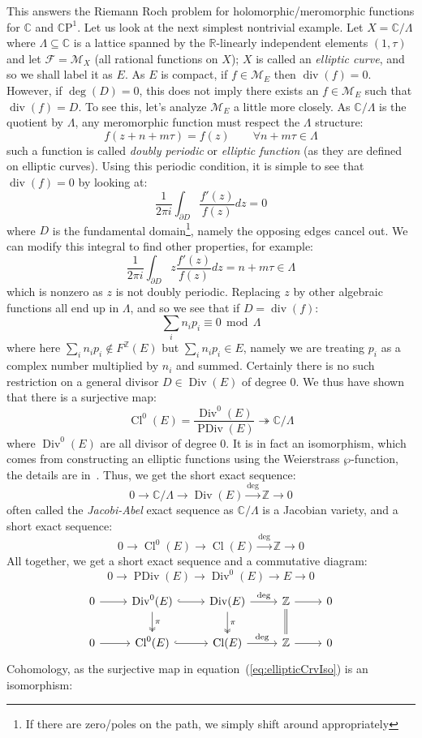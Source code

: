 \documentclass{book}
\newcommand{\C}{{\mathbb{C}}}
\newcommand{\R}{{\mathbb{R}}}
\newcommand{\Z}{{\mathbb{Z}}}
\newcommand{\CF}{{\mathcal{F}}}
\newcommand{\CM}{{\mathcal{M}}}
\newcommand{\CP}{\mathbb{C}\mathrm{P}}
\newcommand{\Cl}{{\operatorname{Cl}}}
\renewcommand{\div}{{\operatorname{div}}}
\newcommand{\Div}{{\operatorname{Div}}}
\newcommand{\PDiv}{{\operatorname{PDiv}}}
\newcommand{\sse}{\subseteq}
\renewcommand{\mod}{\,\operatorname{mod}\,}
\begin{document}
This answers the Riemann Roch problem for holomorphic/meromorphic functions for $\C$ and $\CP^1$. Let us look
at the next simplest nontrivial example. Let $X = \C/\Lambda$ where $\Lambda\sse \C$ is a lattice spanned by
the $\R$-linearly independent elements $(1,\tau)$ and let $\CF = \CM_X$ (all rational functions on $X$); $X$
is called an \emph{elliptic curve}, and so we shall label it as $E$. As $E$ is compact, if $f \in \CM_E$ then
$\div(f) = 0$. However, if $\deg(D) = 0$, this does not imply there exists an $f \in \CM_E$ such that $\div(f)
= D$. To see this, let's analyze $\CM_E$ a little more closely. As $\C/\Lambda$ is the quotient by $\Lambda$,
any meromorphic function must respect the $\Lambda$ structure:
\[
  f(z+n+m\tau) = f(z) \qquad \forall n+m\tau \in \Lambda
\]
such a function is called \emph{doubly periodic} or \emph{elliptic function} (as they are defined on elliptic
curves). Using this periodic condition, it is simple to see that
$\div(f) = 0$ by looking at:
\[
  \frac{1}{2\pi i}\int_{\partial D} \frac{f'(z)}{f(z)}dz = 0
\]
where $D$ is the fundamental domain\footnote{If there are zero/poles on the path, we simply shift around
appropriately}, namely the opposing edges cancel out. We can modify this integral to find other properties,
for example:
\[
  \frac{1}{2\pi i}\int_{\partial D} z\frac{f'(z)}{f(z)}dz = n + m\tau \in \Lambda
\]
which is nonzero as $z$ is not doubly periodic. Replacing $z$ by other algebraic functions all end up in
$\Lambda$, and so we see that if $D = \div(f)$:
\[
  \sum_i n_ip_i \equiv 0 \mod \Lambda
\]
where here $\sum_i n_ip_i\notin F^\Z(E)$ but $\sum_i n_ip_i \in E$, namely we are treating $p_i$ as a complex
number multiplied by $n_i$ and summed. Certainly there is no such restriction on
a general divisor $D \in \Div(E)$ of degree $0$. We thus have shown that there is a surjective map:
\begin{equation}\label{eq:ellipticCrvIso}
  \Cl^0(E) = \frac{\Div^0(E)}{\PDiv(E)} \twoheadrightarrow \C/\Lambda
\end{equation}
where $\Div^0(E)$ are all divisor of degree $0$. It is in fact an isomorphism, which comes from constructing
an elliptic functions using the Weierstrass $\wp$-function, the details are
in~\cite[chapter~5]{NateComplexAnalysis}. Thus, we get the short exact sequence:
\[
  0 \to \C/\Lambda \to \Div(E) \xrightarrow{\deg} \Z \to 0
\]
often called the \emph{Jacobi-Abel} exact sequence as $\C/\Lambda$ is a Jacobian variety, and a short exact sequence:
\[
  0 \to \Cl^0(E) \to \Cl(E) \xrightarrow{\deg} \Z \to 0
\]
All together, we get a short exact sequence and a commutative diagram:
\[
  0 \to \PDiv(E) \to \Div^0(E) \to E \to 0
\]
\[
\begin{tikzcd}
0 \arrow[r] & \mathrm{Div}^0(E) \arrow[r, hook] \arrow[d, two heads, "\pi"] & \mathrm{Div}(E) \arrow[r, "\deg"] \arrow[d, two heads, "\pi"] & \mathbb{Z} \arrow[r] \arrow[d, equals] & 0 \\
0 \arrow[r] & \Cl^0(E) \arrow[r, hook] & \Cl(E) \arrow[r, "\deg"] & \mathbb{Z} \arrow[r] & 0
\end{tikzcd}
\]
Cohomology, as the surjective map in equation~(\ref{eq:ellipticCrvIso}) is an isomorphism:
\end{document}
